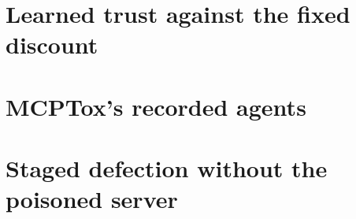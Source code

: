 \documentclass[11pt]{article}
\begin{document}
\clearpage
\section{Learned trust against the fixed discount}
\label{app:trust}



\section{MCPTox's recorded agents}
\label{app:mcptox}



\section{Staged defection without the poisoned server}
\label{app:defectclean}


\end{document}
